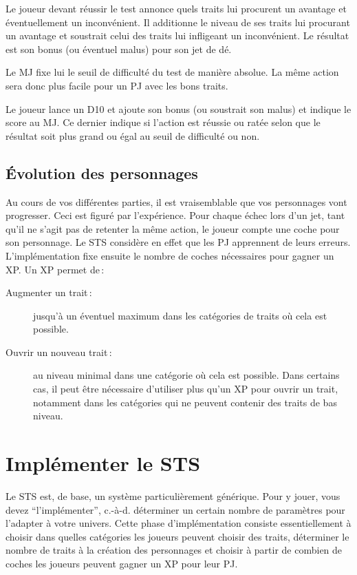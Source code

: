 \documentclass[a4paper,10pt,twoside,twocolumn]{article}
\begin{document}
 Le joueur devant réussir le test annonce quels traits lui procurent un avantage et éventuellement un inconvénient. Il additionne le niveau de ses traits lui procurant un avantage et soustrait celui des traits lui infligeant un inconvénient. Le résultat est son bonus (ou éventuel malus) pour son jet de dé.
 
 Le MJ fixe lui le seuil de difficulté du test de manière absolue. La même action sera donc plus facile pour un PJ avec les bons traits.
 
 Le joueur lance un D10 et ajoute son bonus (ou soustrait son malus) et indique le score au MJ. Ce dernier indique si l'action est réussie ou ratée selon que le résultat soit plus grand ou égal au seuil de difficulté ou non. 

 
 \subsection{Évolution des personnages}
 \label{rule::evolv}
 
 Au cours de vos différentes parties, il est vraisemblable que vos personnages vont progresser. Ceci est figuré par l'expérience. Pour chaque échec lors d'un jet, tant qu'il ne s'agit pas de retenter la même action, le joueur compte une coche pour son personnage. Le STS considère en effet que les PJ apprennent de leurs erreurs. L'implémentation fixe ensuite le nombre de coches nécessaires pour gagner un XP. Un XP permet de\,:
 
 \begin{description}
  \item[Augmenter un trait\,:] jusqu'à un éventuel maximum dans les catégories de traits où cela est possible.
  \item[Ouvrir un nouveau trait\,:] au niveau minimal dans une catégorie où cela est possible. Dans certains cas, il peut être nécessaire d'utiliser plus qu'un XP pour ouvrir un trait, notamment dans les catégories qui ne peuvent contenir des traits de bas niveau.
 \end{description}
 
 \section{Implémenter le STS}
 \label{implem}
 
 Le STS est, de base, un système particulièrement générique. Pour y jouer, vous devez ``l'implémenter'', c.-à-d. déterminer un certain nombre de paramètres pour l'adapter à votre univers. Cette phase d'implémentation consiste essentiellement à choisir dans quelles catégories les joueurs peuvent choisir des traits, déterminer le nombre de traits à la création des personnages et choisir à partir de combien de coches les joueurs peuvent gagner un XP pour leur PJ.
 
\end{document}
